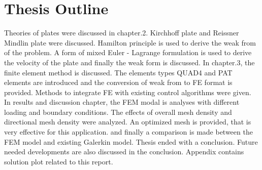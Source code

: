 \documentclass[main.tex]{subfiles}
\begin{document}

 

\section{Thesis Outline}
Theories of plates were discussed in chapter.2. Kirchhoff plate and Reissner Mindlin plate were discussed. Hamilton principle is used to derive the weak from of the problem. A form of mixed Euler - Lagrange formulation is used to derive the velocity of the plate and finally the weak form is discussed. In chapter.3, the finite element method is discussed. The elements types QUAD4 and PAT elements are introduced and the conversion of weak from to FE format is provided. Methods to integrate FE with existing control algorithms were given. In results and discussion chapter, the FEM modal is analyses with different loading and boundary conditions. The effects of overall mesh density and directional mesh density were analyzed. An optimized mesh is provided, that is very effective for this application. and finally a comparison is made between the FEM model and existing Galerkin model. Thesis ended with a conclusion. Future needed developments are also discussed in the conclusion. Appendix contains solution plot related to this report. 
\end{document}
